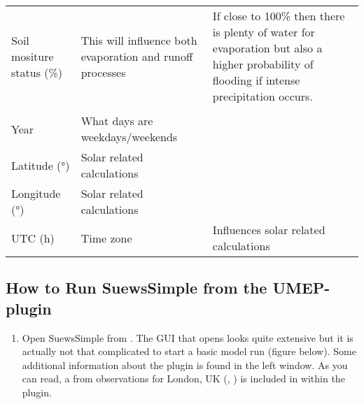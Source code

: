 \documentclass[letterpaper,10pt,english]{sphinxmanual}
\begin{document}
\begin{savenotes}
\begin{tabulary}{\linewidth}[t]{|T|T|T|}
&\\
\hline
Soil mositure status
(\%)
&
This will influence
both evaporation and
runoff processes
&
If close to 100\%
then there is plenty
of water for
evaporation but also
a higher probability
of flooding if
intense precipitation
occurs.
\\
\hline&
&\\
\hline
Year
&
What days are
weekdays/weekends
&\\
\hline
Latitude (°)
&
Solar related
calculations
&\\
\hline
Longitude (°)
&
Solar related
calculations
&\\
\hline
UTC (h)
&
Time zone
&
Influences solar
related calculations
\\
\hline
\end{tabulary}
\par
\sphinxattableend\end{savenotes}


\subsection{How to Run SuewsSimple from the UMEP-plugin}
\label{\detokenize{Tutorials/IntroductionToSuews:how-to-run-suewssimple-from-the-umep-plugin}}\begin{enumerate}
\item {} 
Open SuewsSimple from . The GUI that opens looks quite
extensive but it is actually not that complicated to start a basic
model run (figure below). Some additional information about the plugin is
found in the left window. As you can read, a  from
observations for London, UK (,
)
is included in within the plugin.

\end{enumerate}
\end{document}
